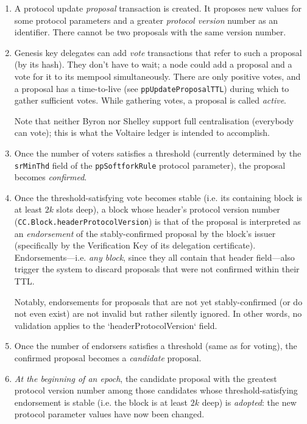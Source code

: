 \begin{enumerate}

\item
A protocol update \emph{proposal} transaction is created. It proposes new values
for some protocol parameters and a greater \emph{protocol version} number as an
identifier. There cannot be two proposals with the same version number.

\item
Genesis key delegates can add \emph{vote} transactions that refer to such a
proposal (by its hash). They don't have to wait; a node could add a proposal and
a vote for it to its mempool simultaneously. There are only positive votes, and
a proposal has a time-to-live (see \lstinline!ppUpdateProposalTTL!) during which
to gather sufficient votes. While gathering votes, a proposal is called
\emph{active}.

Note that neither Byron nor Shelley support full centralisation (everybody can
vote); this is what the Voltaire ledger is intended to accomplish.

\item
Once the number of voters satisfies a threshold (currently determined by the
\lstinline!srMinThd! field of the \lstinline!ppSoftforkRule! protocol
parameter), the proposal becomes \emph{confirmed}.

\item
Once the threshold-satisfying vote becomes stable (i.e. its containing block is at
least $2k$ slots deep), a block whose header's protocol version number
(\lstinline!CC.Block.headerProtocolVersion!) is that of the proposal is
interpreted as an \emph{endorsement} of the stably-confirmed proposal by the
block's issuer (specifically by the Verification Key of its delegation
certificate). Endorsements---i.e. \emph{any block}, since they all contain that
header field---also trigger the system to discard proposals that were not
confirmed within their TTL.

Notably, endorsements for proposals that are not yet stably-confirmed (or do not
even exist) are not invalid but rather silently ignored. In other words, no
validation applies to the `headerProtocolVersion` field.

\item
Once the number of endorsers satisfies a threshold (same as for voting), the
confirmed proposal becomes a \emph{candidate} proposal.

\item
\emph{At the beginning of an epoch}, the candidate proposal with the greatest
protocol version number among those candidates whose threshold-satisfying
endorsement is stable (i.e. the block is at least $2k$ deep) is \emph{adopted}:
the new protocol parameter values have now been changed.


\end{enumerate}
